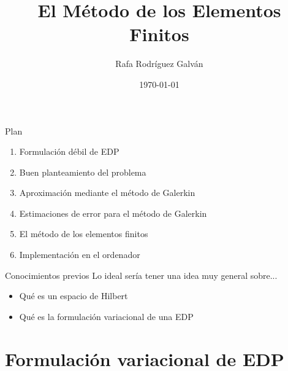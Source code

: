 \documentclass[9pt,leqno]{beamer}
\title{El Método de los Elementos Finitos}
\author{Rafa Rodríguez Galván}
\date{\today}
\begin{document}
\maketitle

\begin{frame}{Plan}

\begin{enumerate}
\setlength\itemsep{1em}
\item Formulación débil de EDP
\item Buen planteamiento del problema
\item Aproximación mediante el método de Galerkin
\item Estimaciones de error para el método de Galerkin
\item El método de los elementos finitos
\item Implementación en el ordenador
\end{enumerate}
\end{frame}


\begin{frame}{Conocimientos previos}
  Lo ideal sería tener una idea muy general sobre...
  \begin{itemize}
  \item Qué es un espacio de Hilbert
  \item Qué es la formulación variacional de una EDP
  \end{itemize}
\end{frame}

\section{Formulación variacional de EDP}
\end{document}
